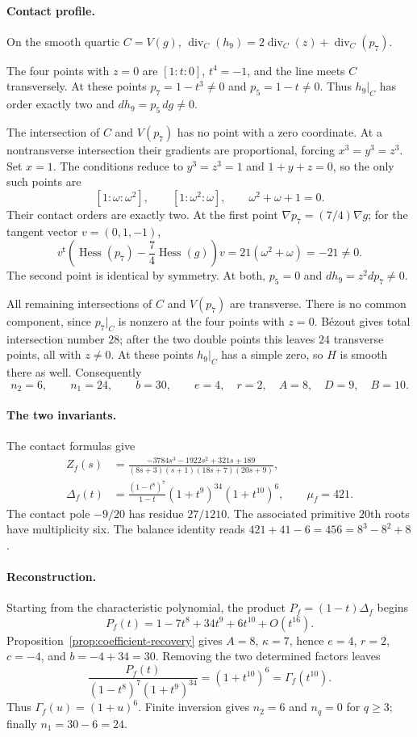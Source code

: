 \documentclass[11pt]{article}
\numberwithin{equation}{section}
\theoremstyle{definition}
\theoremstyle{remark}
\begin{document}
\paragraph{Contact profile.}
On the smooth quartic
$C=V(g)$,
$\operatorname{div}_C(h_9)=2\operatorname{div}_C(z)
                              +\operatorname{div}_C(p_7)$.

The four points with $z=0$ are $[1:t:0]$, $t^4=-1$,
and the line meets $C$ transversely.
At these points $p_7=1-t^3\ne0$ and $p_5=1-t\ne0$.
Thus $h_9|_C$ has order exactly two and
$dh_9=p_5\,dg\ne0$.

The intersection of $C$ and $V(p_7)$ has no point with a zero
coordinate. At a nontransverse intersection their gradients
are proportional, forcing $x^3=y^3=z^3$.
Set $x=1$. The conditions reduce to
$y^3=z^3=1$ and $1+y+z=0$, so the only such points are
\[
 [1:\omega:\omega^2],\qquad[1:\omega^2:\omega],
 \qquad \omega^2+\omega+1=0.
\]
Their contact orders are exactly two.
At the first point $\nabla p_7=(7/4)\nabla g$;
for the tangent vector $v=(0,1,-1)$,
\[
 v^{\mathsf t}
    \left(\operatorname{Hess}(p_7)
           -\frac74\operatorname{Hess}(g)\right)v
       =21(\omega^2+\omega)=-21\ne0.
\]
The second point is identical by symmetry. At both,
$p_5=0$ and $dh_9=z^2dp_7\ne0$.

All remaining intersections of $C$ and $V(p_7)$ are transverse.
There is no common component, since $p_7|_C$ is nonzero at
the four points with $z=0$. B\'ezout gives total intersection
number $28$; after the two double points this leaves
$24$ transverse points, all with $z\ne0$. At these points
$h_9|_C$ has a simple zero, so $H$ is smooth there as well.
Consequently
\[
 n_2=6,\qquad n_1=24,\qquad b=30,\qquad
 e=4,\quad r=2,\quad A=8,\quad D=9,\quad B=10.
\]
\paragraph{The two invariants.}
The contact formulas give
\[
 \begin{aligned}
 Z_f(s)&=\frac{-3784s^3-1922s^2+321s+189}
                {(8s+3)(s+1)(18s+7)(20s+9)},\\
 \Delta_f(t)&=\frac{(1-t^8)^7}{1-t}
                   (1+t^9)^{34}(1+t^{10})^6,\qquad
 \mu_f=421.
 \end{aligned}
\]
The contact pole $-9/20$ has residue $27/1210$.
The associated primitive $20$th roots have multiplicity six.
The balance identity reads $421+41-6=456=8^3-8^2+8$.

\paragraph{Reconstruction.}
Starting from the characteristic polynomial, the product
$P_f=(1-t)\Delta_f$ begins
\[
 P_f(t)=1-7t^8+34t^9+6t^{10}+O(t^{16}).
\]
Proposition~\ref{prop:coefficient-recovery} gives $A=8$,
$\kappa=7$, hence $e=4$, $r=2$, $c=-4$, and $b=-4+34=30$.
Removing the two determined factors leaves
\[
 \frac{P_f(t)}{(1-t^8)^7(1+t^9)^{34}}
       =(1+t^{10})^6=\Gamma_f(t^{10}).
\]
Thus $\Gamma_f(u)=(1+u)^6$. Finite inversion gives
$n_2=6$ and $n_q=0$ for $q\ge3$; finally $n_1=30-6=24$.
\end{document}
